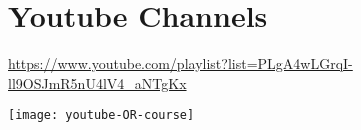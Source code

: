 \section{Youtube Channels}
\url{https://www.youtube.com/playlist?list=PLgA4wLGrqI-ll9OSJmR5nU4lV4_aNTgKx}

\texttt{[image: youtube-OR-course]}
